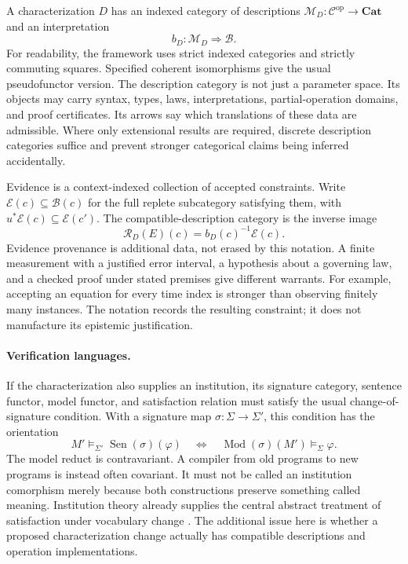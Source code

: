 \documentclass[11pt]{article}
\theoremstyle{definition}
\begin{document}
A characterization $D$ has an indexed category of descriptions
$\mathcal M_D:\mathcal C^{\mathrm{op}}\to\mathbf{Cat}$ and an interpretation
\[
  b_D:\mathcal M_D\Longrightarrow\mathcal B.
\]
For readability, the framework uses strict indexed categories and strictly commuting
squares. Specified coherent isomorphisms give the usual pseudofunctor version.
The description category is not just a parameter space. Its objects may carry
syntax, types, laws, interpretations, partial-operation domains, and proof
certificates. Its arrows say which translations of these data are admissible.
Where only extensional results are required, discrete description categories
suffice and prevent stronger categorical claims being inferred accidentally.

Evidence is a context-indexed collection of accepted constraints. Write
$\mathcal E(c)\subseteq\mathcal B(c)$ for the full replete subcategory satisfying
them, with $u^*\mathcal E(c)\subseteq\mathcal E(c')$. The compatible-description
category is the inverse image
\[
  \mathcal R_D(E)(c)=b_D(c)^{-1}\mathcal E(c).
\]
Evidence provenance is additional data, not erased by this notation. A finite
measurement with a justified error interval, a hypothesis about a governing
law, and a checked proof under stated premises give different warrants.
For example, accepting an equation for every time index is stronger than
observing finitely many instances. The notation records the resulting
constraint; it does not manufacture its epistemic justification.

\paragraph{Verification languages.}
If the characterization also supplies an institution, its signature category,
sentence functor, model functor, and satisfaction relation must satisfy the
usual change-of-signature condition. With a signature map
$\sigma:\Sigma\to\Sigma'$, this condition has the orientation
\[
 M'\models_{\Sigma'}\operatorname{Sen}(\sigma)(\varphi)
 \quad\Longleftrightarrow\quad
 \operatorname{Mod}(\sigma)(M')\models_\Sigma\varphi.
\]
The model reduct is contravariant. A compiler from old programs to new programs
is instead often covariant. It must not be called an institution comorphism
merely because both constructions preserve something called meaning.
Institution theory already supplies the central abstract treatment of
satisfaction under vocabulary change \cite{cc-goguen-burstall,cc-goguen-rosu}.
The additional issue here is whether a proposed characterization change
actually has compatible descriptions and operation implementations.
\end{document}

